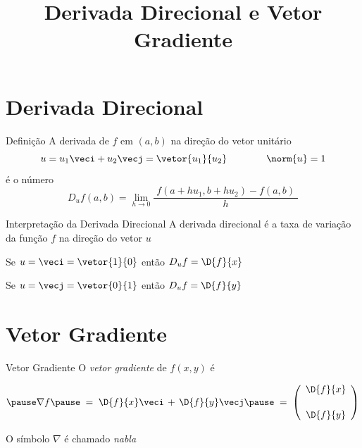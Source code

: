 \documentclass[fleqn,utf8,aspectratio=169,12pt]{beamer}
\title{Derivada Direcional e Vetor Gradiente}
\begin{document}
\addtitle

\section{Derivada Direcional}


\begin{frame}{Definição}
  A derivada de $f$ em $(a, b)$
  \pause
  na direção do vetor unitário
  \[
    u
    = u_1 \veci + u_2 \vecj
    = \vetor{u_1}{u_2}
    \qquad
    \qquad
    \norm{u} = 1
  \]
  \pause
  é o número
  \[
    D_u f(a, b)
    = \lim_{h\to 0} \frac{\;f( a + hu_1, b + hu_2)-f(a, b)\;}{h}
  \]
\end{frame}

\begin{frame}{Interpretação da Derivada Direcional}
  A derivada direcional é a taxa de variação da função $f$ na direção do vetor $u$

  \pause
  \vspace{\baselineskip}
  Se \(u=\veci=\vetor{1}{0}\)
  \pause
  então
  \(
    D_u f = \D{f}{x}
  \)

  \pause
  \vspace{\baselineskip}
  Se \(u=\vecj=\vetor{0}{1}\)
  \pause
  então
  \(
    D_u f = \D{f}{y}
  \)
\end{frame}



\section{Vetor Gradiente}

\begin{frame}{Vetor Gradiente}
  O \emph{vetor gradiente} de $f(x, y)$ é

  \[
    \pause
    \nabla f
    \pause
    \;=\; \D{f}{x}\veci \,+\, \D{f}{y}\vecj
    \pause
    \;=\; \left(\begin{array}{c}
            \displaystyle\D{f}{x} \\[5mm]
            \displaystyle\D{f}{y}
          \end{array}\right)
  \]

  \pause
  O símbolo \(\nabla\) é chamado \emph{nabla}
\end{frame}
\end{document}
